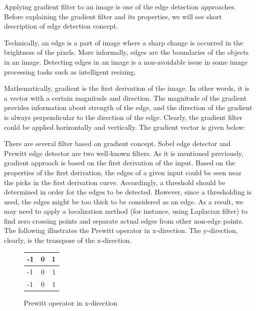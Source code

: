 \documentclass{article}
\begin{document}
			Applying gradient filter to an image is one of the edge detection approaches. Before explaining the gradient filter and its properties, we will see
			short description of edge detection concept. 
			
			Technically, an edge is a part of image where a sharp change is occurred in the brightness of the pixels.
			More informally, edges are the boundaries of
			the objects in an image. Detecting edges in an image is a non-avoidable issue in some image processing tasks such as intelligent resizing.
			
			Mathematically, gradient is the first derivation of the image. In other words, it is a vector with a certain magnitude and direction. 
			The magnitude of the gradient provides information about strength
			of the edge, and the direction of the gradient is always perpendicular to the direction of the edge. Clearly, the gradient filter could be
			applied horizontally and vertically. The gradient vector is given below:

			There are several filter based on gradient concept. Sobel edge detector and Prewitt edge detector are two well-known filters.
			As it is mentioned previously, gradient approach is based on the first derivation of the input. Based on the properties of
			the first derivation, the edges of a given input could be seen near the picks in the first derivation curve. Accordingly, a threshold should be
			determined in order for the edges to be detected. However, since a thresholding is used, the edges might be too thick to be considered
			as an edge. As a result, we may need to apply a localization method (for instance, using Laplacian filter) to find zero
			crossing points and separate actual edges from other non-edge points. The following illustrates the Prewitt operator in x-direction. The y-direction, clearly, is the transpose of the x-direction.


\begin{figure}[H]
\begin{center}
 \begin{tabular}{ | l | c | r | }
    \hline
    -1 & 0 & 1 \\ \hline
    -1 & 0 & 1 \\ \hline
    -1 & 0 & 1 \\
    \hline
  \end{tabular}
\end{center}
\caption{Prewitt operator in x-direction}\end{figure}

		
\end{document}
